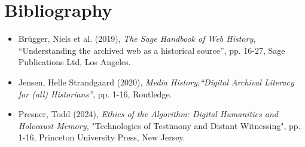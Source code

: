 \documentclass[%
  final,  %
  12pt,  %
  british,
  a4paper
]{article}
\begin{document}
\section*{Bibliography}

\begin{itemize}
    \item Brügger, Niels et al. (2019), \textit{The Sage Handbook of Web History}, “Understanding the archived web as a historical source”, pp. 16-27, Sage Publications Ltd, Los Angeles.
    \item Jensen, Helle Strandgaard (2020), \textit{Media History,“Digital Archival Literacy for (all) Historians”}, pp. 1-16,  Routledge.
    \item Presner, Todd (2024), \textit{Ethics of the Algorithm: Digital Humanities and Holocaust Memory,} "Technologies of Testimony and Distant Witnessing", pp. 1-16, Princeton University Press, New Jersey. 
\end{itemize}
\end{document}
